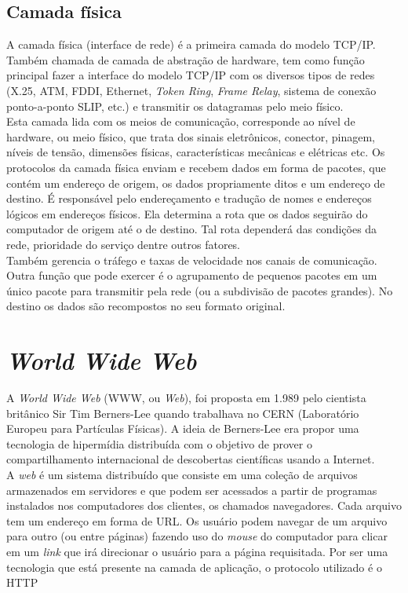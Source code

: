 \subsection{Camada física}
A camada física (interface de rede) é a primeira camada do modelo TCP/IP. 
Também chamada de camada de abstração de hardware, tem como função principal 
fazer a interface do modelo TCP/IP com os diversos tipos de redes (X.25, ATM, 
FDDI, Ethernet, \textit{Token Ring}, \textit{Frame Relay}, sistema de conexão 
ponto-a-ponto SLIP, etc.) e transmitir os datagramas pelo meio físico.\\
Esta camada lida com os meios de comunicação, corresponde ao nível de hardware, 
ou meio físico, que trata dos sinais eletrônicos, conector, pinagem, níveis de 
tensão, dimensões físicas, características mecânicas e elétricas etc. Os 
protocolos da camada física enviam e recebem dados em forma de pacotes, que 
contém um endereço de origem, os dados propriamente ditos e um endereço de 
destino. É responsável pelo endereçamento e tradução de nomes e endereços 
lógicos em endereços físicos. Ela determina a rota que os dados seguirão do 
computador de origem até o de destino. Tal rota dependerá das condições da 
rede, prioridade do serviço dentre outros fatores.\\
Também gerencia o tráfego e taxas de velocidade nos canais de comunicação. 
Outra função que pode exercer é o agrupamento de pequenos pacotes em um único 
pacote para transmitir pela rede (ou a subdivisão de pacotes grandes). No 
destino os dados são recompostos no seu formato original.\\
\section{\textit{World Wide Web}}
A \textit{World Wide Web} (WWW, ou \textit{Web}), foi proposta em 1.989 pelo 
cientista britânico Sir Tim Berners-Lee quando trabalhava no CERN (Laboratório 
Europeu para Partículas Físicas). A ideia de Berners-Lee era propor uma 
tecnologia de hipermídia distribuída com o objetivo de prover o 
compartilhamento internacional de descobertas científicas usando a Internet.\\
A \textit{web} é um sistema distribuído que consiste em uma coleção de 
arquivos armazenados em servidores e que podem ser acessados a partir de 
programas instalados nos computadores dos clientes, os chamados navegadores. 
Cada arquivo tem um endereço em forma de URL. Os usuário podem navegar de um 
arquivo para outro (ou entre páginas) fazendo uso do \textit{mouse} do 
computador para clicar em um \textit{link} que irá direcionar o usuário para a 
página requisitada. Por ser uma tecnologia que está presente na camada de 
aplicação, o protocolo utilizado é o HTTP\\
